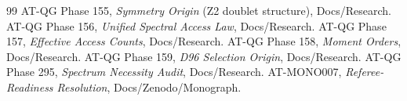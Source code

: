 \begin{thebibliography}{99}
 AT-QG Phase 155, \emph{Symmetry Origin} (Z2 doublet structure), Docs/Research.
 AT-QG Phase 156, \emph{Unified Spectral Access Law}, Docs/Research.
 AT-QG Phase 157, \emph{Effective Access Counts}, Docs/Research.
 AT-QG Phase 158, \emph{Moment Orders}, Docs/Research.
 AT-QG Phase 159, \emph{D96 Selection Origin}, Docs/Research.
 AT-QG Phase 295, \emph{Spectrum Necessity Audit}, Docs/Research.
 AT-MONO007, \emph{Referee-Readiness Resolution}, Docs/Zenodo/Monograph.
\end{thebibliography}
